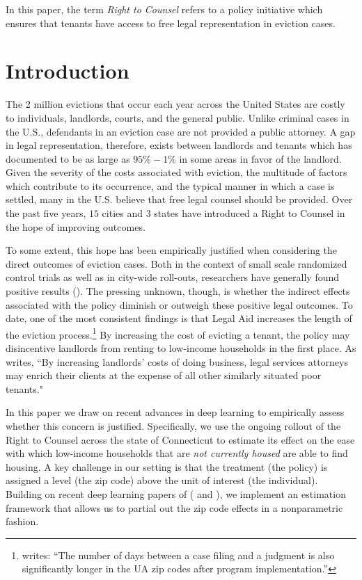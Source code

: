 \documentclass[a4paper,12pt]{article}
\begin{document}


In this paper, the term \textit{Right to Counsel} refers to a policy initiative which ensures that tenants have access to free legal representation in eviction cases. 

\section{Introduction}
The 2 million evictions that occur each year across the United States are costly to individuals, landlords, courts, and the general public. Unlike criminal cases in the U.S., defendants in an eviction case are not provided a public attorney. A gap in legal representation, therefore, exists between landlords and tenants which \cite{collinson2022eviction} has documented to be as large as $95\%-1\%$ in some areas in favor of the landlord. Given the severity of the costs associated with eviction, the multitude of factors which contribute to its occurrence, and the typical manner in which a case is settled, many in the U.S. believe that free legal counsel should be provided.  Over the past five years, $15$ cities and $3$ states have introduced a Right to Counsel in the hope of improving outcomes. \par 

To some extent, this hope has been empirically justified when considering the direct outcomes of eviction cases. Both in the context of small scale randomized control trials as well as in city-wide roll-outs, researchers have generally found positive results (\cite{seron2001impact, greiner2012limits, cassidy2022effects}). The pressing unknown, though, is whether the indirect effects associated with the policy diminish or outweigh these positive legal outcomes. To date, one of the most consistent findings is that Legal Aid increases the length of the eviction process.\footnote{\cite{cassidy2022effects} writes: ``The number of days between a case filing and a judgment is also significantly longer in the UA zip codes after program implementation.''} By increasing the cost of evicting a tenant, the policy may disincentive landlords from renting to low-income households in the first place. As \cite{gunn1995eviction} writes, ``By increasing landlords' costs of doing business, legal services attorneys may enrich their clients at the expense of all other similarly situated poor tenants." \par 
In this paper we draw on recent advances in deep learning to empirically assess whether this concern is justified. Specifically, we use the ongoing rollout of the Right to Counsel across the state of Connecticut to estimate its effect on the ease with which low-income households that are \textit{not currently housed} are able to find housing. A key challenge in our setting is that the treatment (the policy) is assigned a level (the zip code) above the unit of interest (the individual). Building on recent deep learning papers of (\cite{finn2017model} and \cite{kelly2020learning}), we implement an estimation framework that allows us to partial out the zip code effects in a nonparametric fashion.
\end{document}
